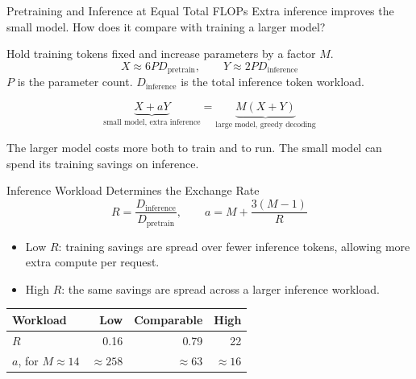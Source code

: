 \documentclass[aspectratio=1610,xcolor=dvipsnames,t]{beamer}
\newcommand{\toprule}{\hline}
\newcommand{\midrule}{\hline}
\newcommand{\bottomrule}{\hline}
\begin{document}
\begin{frame}{Pretraining and Inference at Equal Total FLOPs}
  Extra inference improves the small model. How does it compare with training a larger model?
  \par\smallskip
  Hold training tokens fixed and increase parameters by a factor $M$.
  \[
    X\approx6PD_{\mathrm{pretrain}},\qquad
    Y\approx2PD_{\mathrm{inference}}
  \]
  $P$ is the parameter count. $D_{\mathrm{inference}}$ is the total inference token workload.
  \par\medskip
  \[
    \underbrace{X+aY}_{\text{small model, extra inference}}
    =\underbrace{M(X+Y)}_{\text{large model, greedy decoding}}
  \]
  \par\medskip
  The larger model costs more both to train and to run. The small model can spend its training savings on inference.
\end{frame}

\begin{frame}{Inference Workload Determines the Exchange Rate}
  \[
    R=\frac{D_{\mathrm{inference}}}{D_{\mathrm{pretrain}}},
    \qquad a=M+\frac{3(M-1)}{R}
  \]
  \begin{itemize}
    \item Low $R$: training savings are spread over fewer inference tokens, allowing more extra compute per request.
    \item High $R$: the same savings are spread across a larger inference workload.
  \end{itemize}
  \par\medskip
  \centering
  \begin{tabular}{lrrr}
    \toprule
    Workload & Low & Comparable & High\\
    \midrule
    $R$ & 0.16 & 0.79 & 22\\
    $a$, for $M\approx14$ & $\approx258$ & $\approx63$ & $\approx16$\\
    \bottomrule
  \end{tabular}
\end{frame}
\end{document}

